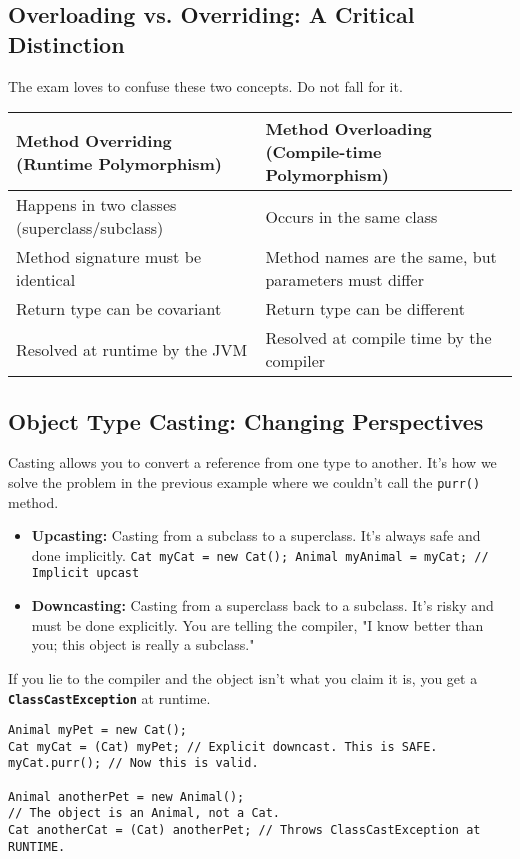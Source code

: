 \documentclass[12pt]{article}
\begin{document}
\begin{enumerate}[label=(\arabic*)]
\subsection{Overloading vs. Overriding: A Critical Distinction}
The exam loves to confuse these two concepts. Do not fall for it. 
\begin{tabular}{|l|l|}
\hline
\textbf{Method Overriding (Runtime Polymorphism)} & \textbf{Method Overloading (Compile-time Polymorphism)} \\
\hline
Happens in two classes (superclass/subclass) & Occurs in the same class \\
\hline
Method signature must be identical & Method names are the same, but parameters must differ \\
\hline
Return type can be covariant & Return type can be different \\
\hline
Resolved at runtime by the JVM & Resolved at compile time by the compiler \\
\hline
\end{tabular}

\subsection{Object Type Casting: Changing Perspectives}
Casting allows you to convert a reference from one type to another. It's how we solve the problem in the previous example where we couldn't call the \texttt{purr()} method.
\begin{itemize}
    \item \textbf{Upcasting:} Casting from a subclass to a superclass. It's always safe and done implicitly.
    \texttt{Cat myCat = new Cat(); Animal myAnimal = myCat; // Implicit upcast}
    \item \textbf{Downcasting:} Casting from a superclass back to a subclass. It's risky and must be done explicitly. You are telling the compiler, "I know better than you; this object is really a subclass."
\end{itemize}
If you lie to the compiler and the object isn't what you claim it is, you get a \textbf{\texttt{ClassCastException}} at runtime.
\begin{verbatim}
Animal myPet = new Cat();
Cat myCat = (Cat) myPet; // Explicit downcast. This is SAFE.
myCat.purr(); // Now this is valid.

Animal anotherPet = new Animal();
// The object is an Animal, not a Cat.
Cat anotherCat = (Cat) anotherPet; // Throws ClassCastException at RUNTIME.
\end{verbatim}


\end{enumerate}
\end{document}

